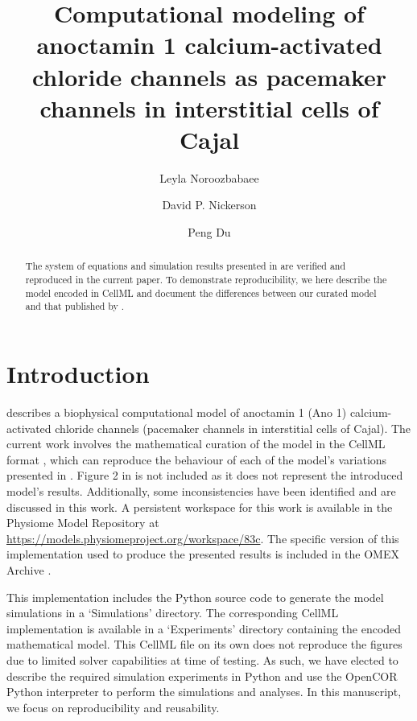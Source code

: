 \documentclass[fleqn,10pt]{physiome}
\title{Computational modeling of anoctamin 1 calcium-activated chloride channels
as pacemaker channels in interstitial cells of Cajal}
\author[1][l.noroozbabaee @auckland.ac.nz]{Leyla Noroozbabaee}
\author[1]{David P. Nickerson}
\author[1a]{Peng Du}
\affil[1]{Auckland Bioengineering Institute, University of Auckland, New Zealand}
\affil[a]{Nominated from the primary publication authors to be a co-author.}
\begin{document}
\maketitle

\begin{abstract}
The system of equations and simulation results presented in \citet{lees2014computational} are verified and reproduced in the current paper. To demonstrate reproducibility, we here describe the model encoded in CellML and document the differences between our curated model and that published by \citeauthor{lees2014computational}.

\end{abstract}



\section{Introduction}
\citet{lees2014computational} describes a biophysical computational model of anoctamin 1 (Ano 1) calcium-activated chloride channels (pacemaker channels in interstitial cells of Cajal). The current work involves the mathematical curation of the model in the CellML format \citep{doi:10.1177/0037549703040939}, which can reproduce the behaviour of each of the model's variations presented in \citet{lees2014computational}. Figure 2 in \citet{lees2014computational} is not included as it does not represent the introduced model's results. Additionally, some inconsistencies have been identified and are discussed in this work. A persistent workspace for this work is available in the Physiome Model Repository at \url{https://models.physiomeproject.org/workspace/83c}. The specific version of this implementation used to produce the presented results is included in the OMEX Archive \citep{bergmann_combine_2014}.

This implementation includes the Python source code to generate the model simulations in a `Simulations' directory. The corresponding CellML implementation is available in a `Experiments' directory containing the encoded mathematical model. This CellML file on its own does not reproduce the figures due to limited solver capabilities at time of testing. As such, we have elected to describe the required simulation experiments in Python and use the OpenCOR \citep{garny_opencor:_2015} Python interpreter to perform the simulations and analyses. In this manuscript, we focus on reproducibility and reusability. 
\end{document}
